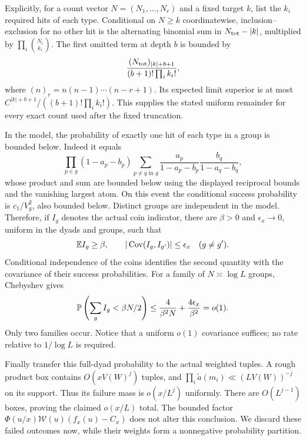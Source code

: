 Explicitly, for a count vector $N=(N_1,\ldots,N_r)$ and a fixed
target $k$, list the $k_i$ required hits of each type.  Conditional
on $N\geq k$ coordinatewise, inclusion--exclusion for no other
hit is the alternating binomial sum in $N_{\rm tot}-|k|$,
multiplied by $\prod_i\binom{N_i}{k_i}$.  The first omitted
term at depth $b$ is bounded by
\[
 \frac{(N_{\rm tot})_{|k|+b+1}}
             {(b+1)!\prod_i k_i!},
\]
where $(n)_r=n(n-1)\cdots(n-r+1)$.  Its expected limit superior
is at most $C^{|k|+b+1}/((b+1)!\prod_i k_i!)$.
This supplies the stated uniform remainder for every exact count
used after the fixed truncation.

In the model, the probability of exactly one hit of each type
in a group is bounded below.  Indeed it equals
\[
 \prod_{p\in g}(1-a_p-b_p)
 \sum_{p\ne q\text{ in }g}
       \frac{a_p}{1-a_p-b_p}\frac{b_q}{1-a_q-b_q},
\]
whose product and sum are bounded below using the displayed
reciprocal bounds and the vanishing largest atom.
On this event the conditional success probability is
$c_1/V_g^2$, also bounded below.  Distinct groups are independent
in the model.  Therefore, if $I_g$ denotes the actual coin
indicator, there are $\beta>0$ and $\epsilon_x\to0$, uniform
in the dyads and groups, such that
\begin{equation}\label{ext:success-covariance}
 \mathbb E I_g\geq\beta,\qquad
 |\operatorname{Cov}(I_g,I_{g'})|\leq\epsilon_x\quad(g\ne g').
\end{equation}
Conditional independence of the coins identifies the second
quantity with the covariance of their success probabilities.
For a family of $N\asymp\log L$ groups, Chebyshev gives
\begin{equation}\label{ext:success-chebyshev}
 \mathbb P\left(\sum_g I_g<\beta N/2\right)
 \leq\frac{4}{\beta^2N}+\frac{4\epsilon_x}{\beta^2}=o(1).
\end{equation}
Only two families occur.  Notice that a uniform $o(1)$ covariance
suffices; no rate relative to $1/\log L$ is required.

Finally transfer this full-dyad probability to the actual
weighted tuples.  A rough product box contains
$O(xV(W)^j)$ tuples, and
$\prod_i\widetilde a(m_i)\ll(LV(W))^{-j}$ on its support.
Thus its failure mass is $o(x/L^j)$ uniformly.  There are
$O(L^{j-1})$ boxes, proving the claimed $o(x/L)$ total.
The bounded factor $\Phi(u/x)\mathcal W(u)(f_x(u)-C_x)$ does not
alter this conclusion.  We discard these failed outcomes now,
while their weights form a nonnegative probability partition.

